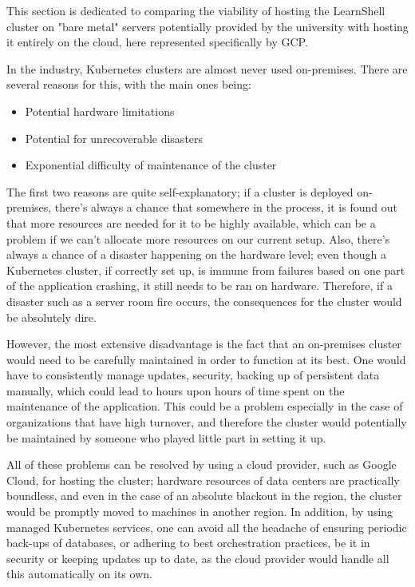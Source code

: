 \documentclass[thesis=B,english]{FITthesis}[2019/12/23]
\begin{document}
This section is dedicated to comparing the viability of hosting the LearnShell cluster on "bare metal" servers potentially provided by the university with hosting it entirely on the cloud, here represented specifically by GCP.

In the industry, Kubernetes clusters are almost never used on-premises. There are several reasons for this, with the main ones being:

\begin{itemize}
  \setlength\itemsep{0em}
  \item Potential hardware limitations
  \item Potential for unrecoverable disasters
  \item Exponential difficulty of maintenance of the cluster
\end{itemize}

The first two reasons are quite self-explanatory; if a cluster is deployed on-premises, there's always a chance that somewhere in the process, it is found out that more resources are needed for it to be highly available, which can be a problem if we can't allocate more resources on our current setup. Also, there's always a chance of a disaster happening on the hardware level; even though a Kubernetes cluster, if correctly set up, is immune from failures based on one part of the application crashing, it still needs to be ran on hardware. Therefore, if a disaster such as a server room fire occurs, the consequences for the cluster would be absolutely dire.

However, the most extensive disadvantage is the fact that an on-premises cluster would need to be carefully maintained in order to function at its best. One would have to consistently manage updates, security, backing up of persistent data manually, which could lead to hours upon hours of time spent on the maintenance of the application. This could be a problem especially in the case of organizations that have high turnover, and therefore the cluster would potentially be maintained by someone who played little part in setting it up.

All of these problems can be resolved by using a cloud provider, such as Google Cloud, for hosting the cluster; hardware resources of data centers are practically boundless, and even in the case of an absolute blackout in the region, the cluster would be promptly moved to machines in another region. In addition, by using managed Kubernetes services, one can avoid all the headache of ensuring periodic back-ups of databases, or adhering to best orchestration practices, be it in security or keeping updates up to date, as the cloud provider would handle all this automatically on its own. \cite{cloud-native-kube}
\end{document}
